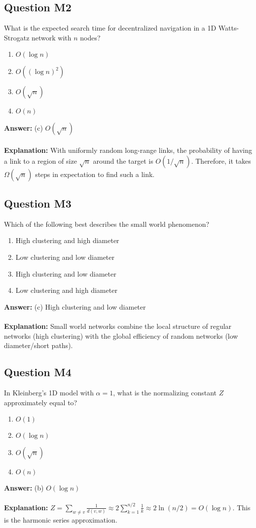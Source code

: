 \documentclass[11pt,a4paper]{article}
\theoremstyle{definition}
\begin{document}
\subsection{Question M2}
What is the expected search time for decentralized navigation in a 1D Watts-Strogatz network with $n$ nodes?
\begin{enumerate}[label=(\alph*)]
\item $O(\log n)$
\item $O((\log n)^2)$
\item $O(\sqrt{n})$
\item $O(n)$
\end{enumerate}
\textbf{Answer:} (c) $O(\sqrt{n})$\\
\\
\textbf{Explanation:} With uniformly random long-range links, the probability of having a link to a region of size $\sqrt{n}$ around the target is $O(1/\sqrt{n})$. Therefore, it takes $\Omega(\sqrt{n})$ steps in expectation to find such a link.
\subsection{Question M3}
Which of the following best describes the small world phenomenon?
\begin{enumerate}[label=(\alph*)]
\item High clustering and high diameter
\item Low clustering and low diameter
\item High clustering and low diameter
\item Low clustering and high diameter
\end{enumerate}
\textbf{Answer:} (c) High clustering and low diameter\\
\\
\textbf{Explanation:} Small world networks combine the local structure of regular networks (high clustering) with the global efficiency of random networks (low diameter/short paths).
\subsection{Question M4}
In Kleinberg's 1D model with $\alpha = 1$, what is the normalizing constant $Z$ approximately equal to?
\begin{enumerate}[label=(\alph*)]
\item $O(1)$
\item $O(\log n)$
\item $O(\sqrt{n})$
\item $O(n)$
\end{enumerate}
\textbf{Answer:} (b) $O(\log n)$\\
\\
\textbf{Explanation:} $Z = \sum_{w \neq v} \frac{1}{d(v,w)} \approx 2\sum_{k=1}^{n/2} \frac{1}{k} \approx 2\ln(n/2) = O(\log n)$. This is the harmonic series approximation.
\end{document}
